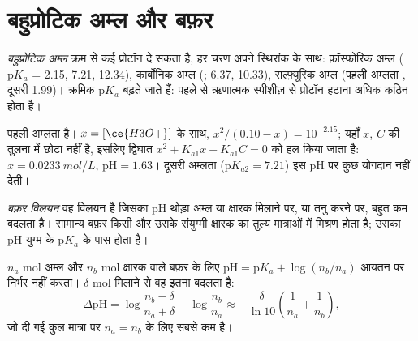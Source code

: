 \section{बहुप्रोटिक अम्ल और बफ़र}

\begin{definition}[बहुप्रोटिक अम्ल]\label{def:b1:predominant-reaction:polyprotic}
\emph{बहुप्रोटिक अम्ल} क्रम से कई प्रोटॉन
दे सकता है, हर चरण अपने स्थिरांक के साथ: फ़ॉस्फ़ोरिक अम्ल
 ($\mathrm{p}K_a$ = 2.15, 7.21, 12.34), कार्बोनिक अम्ल
(; 6.37, 10.33), सल्फ़्यूरिक अम्ल (पहली अम्लता , दूसरी
1.99)। क्रमिक $\mathrm{p}K_a$ बढ़ते जाते हैं: पहले से ऋणात्मक स्पीशीज़ से
प्रोटॉन हटाना अधिक कठिन होता है।
\end{definition}

\begin{example}\label{ex:b1:predominant-reaction:h3po4}
 पहली अम्लता है। $x = [\ce{H3O+}]$ के साथ,
$x^2/(0.10 - x) = 10^{-2.15}$; यहाँ $x$, $C$ की तुलना में छोटा नहीं है, इसलिए
द्विघात $x^2 + K_{a1}x - K_{a1}C = 0$ को हल किया जाता है: $x =
\qty{0.0233}{mol/L}$, $\mathrm{pH} = 1.63$। दूसरी अम्लता
($\mathrm{p}K_{a2} = 7.21$) इस pH पर कुछ योगदान नहीं देती।
\end{example}

\begin{definition}[बफ़र विलयन]\label{def:b1:predominant-reaction:buffer}
\emph{बफ़र विलयन} वह विलयन है जिसका pH
थोड़ा अम्ल या क्षारक मिलाने पर, या तनु करने पर, बहुत कम
बदलता है। सामान्य बफ़र किसी  और उसके संयुग्मी
क्षारक का तुल्य मात्राओं में मिश्रण होता है; उसका pH युग्म के
$\mathrm{p}K_a$ के पास होता है।
\end{definition}

\begin{proposition}[बफ़र प्रतिरोध क्यों करता है]\label{prop:b1:predominant-reaction:buffer}
$n_a$ mol अम्ल और $n_b$ mol क्षारक वाले बफ़र के लिए $\mathrm{pH} =
\mathrm{p}K_a + \log(n_b/n_a)$ आयतन पर निर्भर नहीं करता।
$\delta$ mol  मिलाने से वह इतना बदलता है:
\[
  \Delta\mathrm{pH} = \log\frac{n_b - \delta}{n_a + \delta} - \log\frac{n_b}{n_a}
  \approx -\frac{\delta}{\ln 10}\left(\frac{1}{n_a} + \frac{1}{n_b}\right),
\]
जो दी गई कुल मात्रा पर $n_a = n_b$ के लिए सबसे कम है।
\end{proposition}

